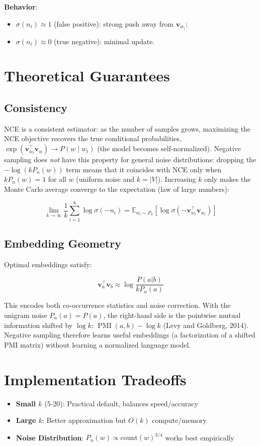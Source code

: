 \begin{notechapter}
\textbf{Behavior}:
\begin{itemize}
\item \( \sigma(n_i) \approx 1 \) (false positive): strong push
away from \( \mathbf{v}_{w_i} \);
\item \( \sigma(n_i) \approx 0 \) (true negative): minimal update.
\end{itemize}

\section{Theoretical Guarantees}
\subsection{Consistency}
NCE is a consistent estimator: as the number of samples grows, maximizing the NCE objective recovers the true conditional probabilities, \( \exp(\mathbf{v}_{w_t}^\top \mathbf{v}_w) \to P(w \mid w_t) \) (the model becomes self-normalized). Negative sampling does \emph{not} have this property for general noise distributions: dropping the \( -\log(kP_n(w)) \) term means that it coincides with NCE only when \( kP_n(w) = 1 \) for all \( w \) (uniform noise and \( k = |V| \)). Increasing \( k \) only makes the Monte Carlo average converge to the expectation (law of large numbers):

\[
\lim_{k \to \infty} \frac{1}{k} \sum_{i=1}^k \log \sigma(-n_i) 
= \mathbb{E}_{w_i \sim P_n}[\log \sigma(-\mathbf{v}_{w_t}^\top 
\mathbf{v}_{w_i})]
\]

\subsection{Embedding Geometry}
Optimal embeddings satisfy:

\[
\mathbf{v}_a^\top \mathbf{v}_b \approx \log \frac{P(a|b)}{kP_n(a)}
\]

This encodes both co-occurrence statistics and noise
correction. With the unigram noise \( P_n(a) = P(a) \), the right-hand side is the pointwise mutual information shifted by \( \log k \): \( \operatorname{PMI}(a,b) - \log k \) (Levy and Goldberg, 2014). Negative sampling therefore learns useful embeddings (a factorization of a shifted PMI matrix) without learning a normalized language model.

\section{Implementation Tradeoffs}
\begin{itemize}
    \item \textbf{Small \( k \)} (5-20): Practical default, 
    balances speed/accuracy
    \item \textbf{Large \( k \)}: Better approximation but 
    \( O(k) \) compute/memory
    \item \textbf{Noise Distribution}: \( P_n(w) \propto 
    \text{count}(w)^{3/4} \) works best empirically
\end{itemize}
\end{notechapter}
